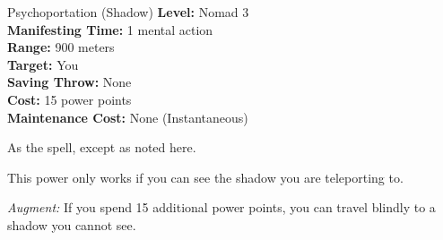 {Psychoportation (Shadow)}
{
	\textbf{Level:}
	Nomad 3\\
	\textbf{Manifesting Time:}
	1 mental action\\
	\textbf{Range:}
	900 meters\\
	\textbf{Target:}
	You\\
	\textbf{Saving Throw:}
	None\\
	\textbf{Cost:}
	15 power points\\
	\textbf{Maintenance Cost:}
	None (Instantaneous)\\
}
{
	As the  spell, except as noted here.

	This power only works if you can see the shadow you are teleporting to.

	\textit{Augment:} If you spend 15 additional power points, you can travel blindly to a shadow you cannot see.
}